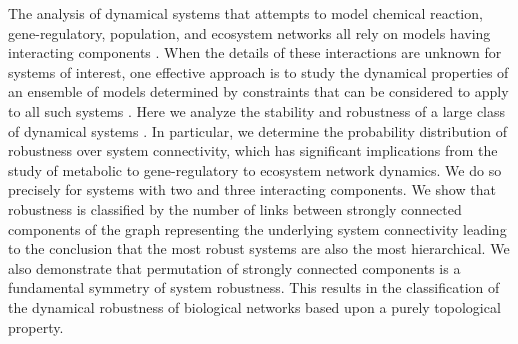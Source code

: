 The analysis of dynamical systems that attempts to model chemical reaction, gene-regulatory, population, and ecosystem networks all rely on models having interacting components \cite{RossCr2003,Alon2006,Palsson2006,HamidBolouri2008,Palsson2011a,Voit2012,Sauro2012}. When the details of these interactions are unknown for systems of interest, one effective approach is to study the dynamical properties of an ensemble of models determined by constraints that can be considered to apply to all such systems \cite{Gardner1970,May1972,Cohen1984,May1972a,Radius2014}. Here we analyze the stability and robustness of a large class of dynamical systems \cite{WADDINGTON1942a,VanNimwegen1999,Siegal2002,Ciliberti2007b,Ciliberti2007,Wagner2013}. In particular, we determine the probability distribution of robustness over system connectivity, which has significant implications from the study of metabolic to gene-regulatory to ecosystem network dynamics. We do so precisely for systems with two and three interacting components. We show that robustness is classified by the number of links between strongly connected components of the graph representing the underlying system connectivity leading to the conclusion that the most robust systems are also the most hierarchical. We also demonstrate that permutation of strongly connected components is a fundamental symmetry of system robustness. This results in the classification of the dynamical robustness of biological networks based upon a purely topological property.
